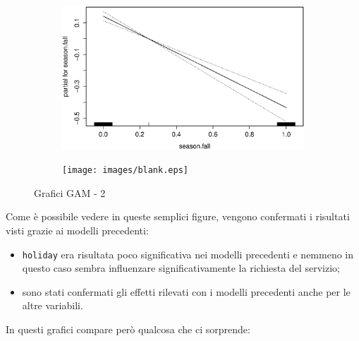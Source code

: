 \begin{figure}[H]
        \medskip
        \begin{subfigure}{0.4\textwidth}
          \includegraphics[width=\columnwidth]{images/non-linear/gam/gam-fall.eps}
        \end{subfigure}
        \hspace*{\fill}
        \begin{subfigure}{0.4\textwidth}
          \texttt{[image: images/blank.eps]}
        \end{subfigure}

        \caption{Grafici GAM - 2}\label{fig:gam-1}
\end{figure}

Come è possibile vedere in queste semplici figure, vengono confermati i
risultati visti grazie ai modelli precedenti:

\begin{itemize}
\item \texttt{holiday} era risultata poco significativa nei modelli precedenti
  e nemmeno in questo caso sembra influenzare significativamente la richiesta del servizio;
\item sono stati confermati gli effetti rilevati con i modelli precedenti
  anche per le altre variabili.
\end{itemize}

In questi grafici compare però qualcosa che ci sorprende:

